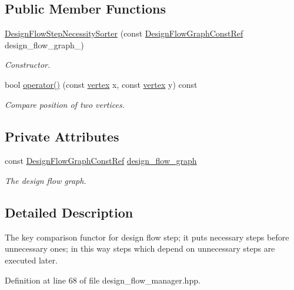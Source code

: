 \subsection*{Public Member Functions}
\begin{DoxyCompactItemize}
\item 
\hyperlink{classDesignFlowStepNecessitySorter_a4242c5e0217b38fbb3a37c8e364be845}{Design\+Flow\+Step\+Necessity\+Sorter} (const \hyperlink{design__flow__graph_8hpp_a0230319e566e6824d3d187b6871598f7}{Design\+Flow\+Graph\+Const\+Ref} design\+\_\+flow\+\_\+graph\+\_\+)
\begin{DoxyCompactList}\small\item\em Constructor. \end{DoxyCompactList}\item 
bool \hyperlink{classDesignFlowStepNecessitySorter_a65b3cb6dfb4838ed2a42aba6e3fc0900}{operator()} (const \hyperlink{graph_8hpp_abefdcf0544e601805af44eca032cca14}{vertex} x, const \hyperlink{graph_8hpp_abefdcf0544e601805af44eca032cca14}{vertex} y) const
\begin{DoxyCompactList}\small\item\em Compare position of two vertices. \end{DoxyCompactList}\end{DoxyCompactItemize}
\subsection*{Private Attributes}
\begin{DoxyCompactItemize}
\item 
const \hyperlink{design__flow__graph_8hpp_a0230319e566e6824d3d187b6871598f7}{Design\+Flow\+Graph\+Const\+Ref} \hyperlink{classDesignFlowStepNecessitySorter_a345a0b022d447f162aed897db3971534}{design\+\_\+flow\+\_\+graph}
\begin{DoxyCompactList}\small\item\em The design flow graph. \end{DoxyCompactList}\end{DoxyCompactItemize}


\subsection{Detailed Description}
The key comparison functor for design flow step; it puts necessary steps before unnecessary ones; in this way steps which depend on unnecessary steps are executed later. 

Definition at line 68 of file design\+\_\+flow\+\_\+manager.\+hpp.



